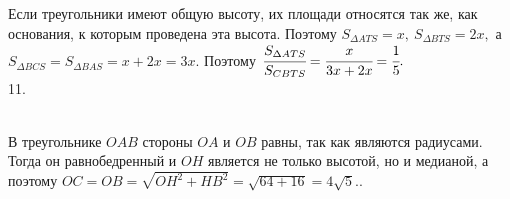 \documentclass[12pt]{article}
\begin{document}
Если треугольники имеют общую высоту, их площади относятся так же, как основания, к которым проведена эта высота. Поэтому $S_{\Delta ATS}=x,\ S_{\Delta BTS}=2x,$ а $S_{\Delta BCS}=S_{\Delta BAS}=x+2x=3x.$ Поэтому $\cfrac{S_{\Delta ATS}}{S_{CBTS}}=\cfrac{x}{3x+2x}=\cfrac{1}{5}.$\\
11. \begin{figure}[ht!]
\end{figure}\\
В треугольнике $OAB$ стороны $OA$ и $OB$ равны, так как являются радиусами. Тогда он равнобедренный и $OH$ является не только высотой, но и медианой, а поэтому $OC=OB=\sqrt{OH^2+HB^2}=\sqrt{64+16}=4\sqrt{5}.$\newpage{}. \begin{figure}[ht!]
\end{figure}\\
\end{document}

